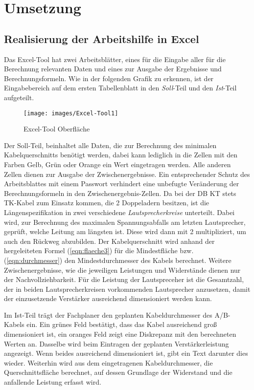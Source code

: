 \chapter{Umsetzung}
\label{cha:Umsetzung}

\section{Realisierung der Arbeitshilfe in Excel}
\label{sec:Realisierung}
Das Excel-Tool hat zwei Arbeitsblätter, eines für die Eingabe aller für die Berechnung relevanten Daten und eines zur Ausgabe der Ergebnisse und Berechnungsformeln. Wie in der folgenden Grafik zu erkennen, ist der Eingabebereich auf dem ersten Tabellenblatt in den \textit{Soll}-Teil und den \textit{Ist}-Teil aufgeteilt.

\begin{figure}[H]
\centering
\texttt{[image: images/Excel-Tool1]}
\caption{Excel-Tool Oberfläche}
\label{fig:Excel-Tool1}
\end{figure}

Der Soll-Teil, beinhaltet alle Daten, die zur Berechnung des minimalen Kabelquerschnitts benötigt werden, dabei kann lediglich in die Zellen mit den Farben Gelb, Grün oder Orange ein Wert eingetragen werden. Alle anderen Zellen dienen zur Ausgabe der Zwischenergebnisse. Ein entsprechender Schutz des Arbeitsblattes mit einem Passwort verhindert eine unbefugte Veränderung der Berechnungsformeln in den Zwischenergebnis-Zellen. Da bei der DB KT stets TK-Kabel zum Einsatz kommen, die 2 Doppeladern besitzen, ist die Längenspezifikation in zwei verschiedene \textit{Lautsprecherkreise} unterteilt. Dabei wird, zur Berechnung des maximalen Spannungsabfalls am letzten Lautsprecher, geprüft, welche Leitung am längsten ist. Diese wird dann mit 2 multipliziert, um auch den Rückweg abzubilden. Der Kabelquerschnitt wird anhand der hergeleiteten Formel (\ref{eqn:flaeche3}) für die Mindestfläche bzw. (\ref{eqn:durchmesser}) den Mindestdurchmesser des Kabels berechnet. Weitere Zwischenergebnisse, wie die jeweiligen Leistungen und Widerstände dienen nur der Nachvollziehbarkeit. Für die Leistung der Lautspreceher ist die Gesamtzahl, der in beiden Lautsprecherkreisen vorkommenden Lautsprecher anzusetzen, damit der einzusetzende Verstärker ausreichend dimensioniert werden kann.

Im Ist-Teil trägt der Fachplaner den geplanten Kabeldurchmesser des A/B-Kabels ein. Ein grünes Feld bestätigt, dass das Kabel ausreichend groß dimensioniert ist, ein oranges Feld zeigt eine Diskrepanz mit den berechneten Werten an. Dasselbe wird beim Eintragen der geplanten Verstärkerleistung angezeigt. Wenn beides ausreichend dimensioniert ist, gibt ein Text darunter dies wieder. Weiterhin wird aus dem eingetragenen Kabeldurchmesser, die Querschnittsfläche berechnet, auf dessen Grundlage der Widerstand und die anfallende Leistung erfasst wird.

